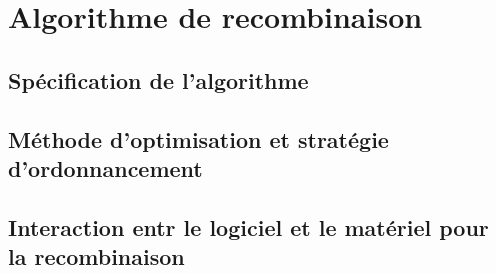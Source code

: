 \section{Algorithme de recombinaison}
\subsection{Spécification de l'algorithme}
\subsection{Méthode d'optimisation et stratégie d'ordonnancement}
\subsection{Interaction entr le logiciel et le matériel pour la recombinaison}